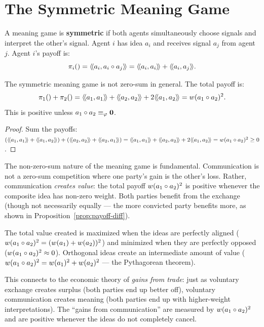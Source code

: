 \section{The Symmetric Meaning Game}

\begin{definition}
\label{def:symmetric-game}
A meaning game is \textbf{symmetric} if both agents simultaneously choose
signals and interpret the other's signal. Agent $i$ has idea $a_i$ and receives
signal $a_j$ from agent $j$. Agent $i$'s payoff is:
\[
  \pi_{i}() = \langle\!\langle a_i, a_i \circ a_j \rangle\!\rangle = \langle\!\langle a_i, a_i \rangle\!\rangle + \langle\!\langle a_i, a_j \rangle\!\rangle.
\]
\end{definition}

\begin{theorem}
\label{thm:not-zero-sum}
The symmetric meaning game is not zero-sum in general. The total payoff is:
\[
  \pi_{1}() + \pi_{2}() = \langle\!\langle a_1, a_1 \rangle\!\rangle + \langle\!\langle a_2, a_2 \rangle\!\rangle + 2\langle\!\langle a_1, a_2 \rangle\!\rangle
  = w(a_1 \circ a_2)^2.
\]
This is positive unless $a_1 \circ a_2 \equiv_\varphi \mathbf{0}$.
\end{theorem}

\begin{proof}
Sum the payoffs: $(\rs{a_1}{a_1} + \rs{a_1}{a_2}) + (\rs{a_2}{a_2} +
\rs{a_2}{a_1}) = \rs{a_1}{a_1} + \rs{a_2}{a_2} + 2\rs{a_1}{a_2} =
w(a_1 \compose a_2)^2 \geq 0$.
\end{proof}

\begin{interpretation}
\label{interp:value-creation}
The non-zero-sum nature of the meaning game is fundamental. Communication is
not a zero-sum competition where one party's gain is the other's loss.
Rather, communication \emph{creates value}: the total payoff $w(a_1 \circ
a_2)^2$ is positive whenever the composite idea has non-zero weight. Both
parties benefit from the exchange (though not necessarily equally --- the
more convicted party benefits more, as shown in Proposition~\ref{prop:payoff-diff}).

The total value created is maximized when the ideas are perfectly aligned
($w(a_1 \circ a_2)^2 = (w(a_1) + w(a_2))^2$) and minimized when they are
perfectly opposed ($w(a_1 \circ a_2)^2 \approx 0$). Orthogonal ideas create
an intermediate amount of value ($w(a_1 \circ a_2)^2 = w(a_1)^2 + w(a_2)^2$
--- the Pythagorean theorem).

This connects to the economic theory of \emph{gains from trade}: just as
voluntary exchange creates surplus (both parties end up better off), voluntary
communication creates meaning (both parties end up with higher-weight
interpretations). The ``gains from communication'' are measured by
$w(a_1 \circ a_2)^2$ and are positive whenever the ideas do not completely
cancel.
\end{interpretation}

